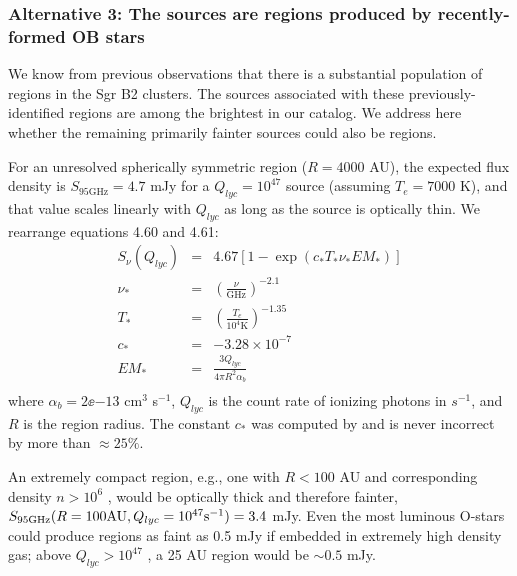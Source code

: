 \documentclass[twocolumn]{aastex61}
\begin{document}
\subsubsection{Alternative 3: The sources are \hii regions produced by
recently-formed OB stars}
\label{sec:theyarehiiregions}

We know from previous observations
\citep[e.g.][]{Mehringer1995b,de-Pree1996a,de-Pree2015a} that there is a
substantial population of \hii regions in the Sgr B2 clusters.  The \nhii
sources associated with these previously-identified \hii regions are among the
brightest in our catalog.  We address here whether the remaining primarily
fainter sources could also be \hii regions.

For an unresolved spherically symmetric \hii region ($R=4000$ AU), the expected
flux density is $S_{95 \mathrm{GHz}} = 4.7$ mJy for a $Q_{lyc}=10^{47}$ \pers
source (assuming $T_e=7000$ K), and that value scales linearly with $Q_{lyc}$
as long as the source is optically thin.   We rearrange \citet{Condon2007a}
equations 4.60 and 4.61:
\begin{eqnarray}
S_{\nu}(Q_{lyc})  &=& 4.67 \left[1-\exp\left(c_* T_* \nu_* EM_* \right) \right] \nonumber \\
\nu_* &=& \left(\frac{\nu}{\mathrm{GHz}}\right)^{-2.1} \nonumber \\
T_* &=& \left(\frac{T_e}{10^4 \mathrm{K}}\right)^{-1.35} \nonumber \\
c_* &=& -3.28\times10^{-7} \nonumber \\
EM_* &=& \frac{3 Q_{lyc}}{4 \pi R^2 \alpha_b} \nonumber \\
\end{eqnarray}
where $\alpha_b=2\ee{-13}$ cm$^3$ s$^{-1}$, $Q_{lyc}$ is the count rate
of ionizing photons in $s^{-1}$, and $R$ is the \hii region radius.
The constant $c_*$ was computed by \citet{Mezger1967a} and is never
incorrect by more than $\approx25\%$.

An extremely compact \hii region,
e.g., one with $R<100$ AU and corresponding density $n>10^6$ \percc, would be
optically thick and therefore fainter, $S_{95 \mathrm{GHz}}(R=100 \mathrm{AU},
Q_{lyc}=10^{47} \mathrm{s}^{-1})=3.4$ mJy.  Even the most luminous O-stars could produce \hii
regions as faint as 0.5 mJy if embedded in extremely high density gas; above
$Q_{lyc}>10^{47}$ \pers, a 25 AU \hii region would be $\sim0.5$ mJy.
\end{document}
